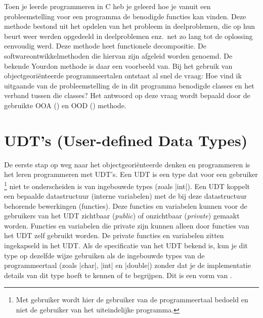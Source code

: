 \begin{cpplstShortInline}
Toen je leerde programmeren in C heb je geleerd hoe je vanuit een probleemstelling voor een programma de benodigde functies kan vinden.
Deze methode bestond uit het opdelen van het probleem in deelproblemen, die op hun beurt weer werden opgedeeld in deelproblemen enz.\ net zo lang tot de oplossing eenvoudig werd.
Deze methode heet functionele decompositie.
De softwareontwikkelmethoden die hiervan zijn afgeleid worden \emph{} genoemd.
De bekende Yourdon methode \cite{Yourdon2006} is daar een voorbeeld van.
Bij het gebruik van objectgeoriënteerde programmeertalen ontstaat al snel de
vraag: Hoe vind ik uitgaande van de probleemstelling de in dit programma benodigde classes en het verband tussen die classes?
Het antwoord op deze vraag wordt bepaald door de gebruikte OOA () en OOD () methode.

\section{UDT's (User-defined Data Types)}
\label{UDT}
De eerste stap op weg naar het objectgeoriënteerde denken en programmeren is het leren programmeren met UDT's.
Een UDT is een  type dat voor een gebruiker%
\footnote{%
    Met gebruiker wordt hier de gebruiker van de programmeertaal bedoeld en niet de gebruiker van het uiteindelijke programma.
} niet te onderscheiden is van
ingebouwde types (zoals |int|).
Een UDT koppelt een bepaalde datastructuur (interne variabelen) met de bij deze datastructuur behorende bewerkingen (functies).
Deze functies en variabelen kunnen voor de gebruikers van het UDT zichtbaar (\emph{public}) of onzichtbaar (\emph{private}) gemaakt worden.
Functies en variabelen die private zijn kunnen alleen door functies van het UDT zelf gebruikt worden.
De private functies en variabelen zitten ingekapseld in het UDT.
Als de specificatie van het UDT bekend is, kun je dit type op dezelfde wijze gebruiken als de ingebouwde types van de programmeertaal (zoals |char|, |int| en |double|) zonder dat je de implementatie details van dit type hoeft te kennen of te begrijpen.
Dit is een vorm van .


\end{cpplstShortInline}
